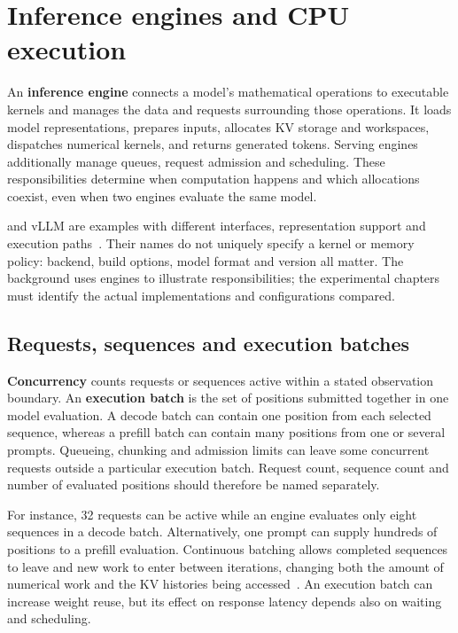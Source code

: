 \section{Inference engines and CPU execution}
\label{sec:inference-engines}

An \textbf{inference engine} connects a model's mathematical operations
to executable kernels and manages the data and requests surrounding
those operations.  It loads model representations, prepares inputs,
allocates KV storage and workspaces, dispatches numerical kernels, and
returns generated tokens.  Serving engines additionally manage queues,
request admission and scheduling.  These responsibilities determine when
computation happens and which allocations coexist, even when two
engines evaluate the same model.

\lcpp{} and vLLM are examples with different interfaces, representation
support and execution paths~\cite{llamacppproject2026,vllm2026}.  Their
names do not uniquely specify a kernel or memory policy: backend,
build options, model format and version all matter.  The background uses
engines to illustrate responsibilities; the experimental chapters must
identify the actual implementations and configurations compared.

\subsection{Requests, sequences and execution batches}

\textbf{Concurrency} counts requests or sequences active within a
stated observation boundary.  An \textbf{execution batch} is the set of
positions submitted together in one model evaluation.  A decode batch
can contain one position from each selected sequence, whereas a prefill
batch can contain many positions from one or several prompts.  Queueing,
chunking and admission limits can leave some concurrent requests outside
a particular execution batch.  Request count, sequence count and number
of evaluated positions should therefore be named separately.

For instance, 32 requests can be active while an engine evaluates only
eight sequences in a decode batch.  Alternatively, one prompt can supply
hundreds of positions to a prefill evaluation.  Continuous batching
allows completed sequences to leave and new work to enter between
iterations, changing both the amount of numerical work and the KV
histories being accessed~\cite{kwon2023pagedattention}.  An execution batch
can increase weight reuse, but its effect on response latency depends
also on waiting and scheduling.

